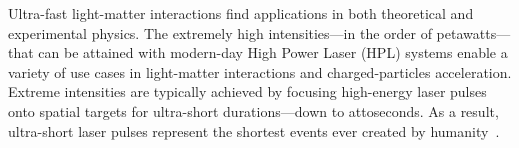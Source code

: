 


Ultra-fast light-matter interactions find applications in both theoretical and experimental physics. The extremely high intensities---in the order of petawatts---that can be attained with modern-day High Power Laser (HPL) systems enable a variety of use cases in light-matter interactions and charged-particles acceleration. Extreme intensities are typically achieved by focusing high-energy laser pulses onto spatial targets for ultra-short durations---down to attoseconds. As a result, ultra-short laser pulses represent the shortest events ever created by humanity~\citep{gaumnitz2017streaking}.

